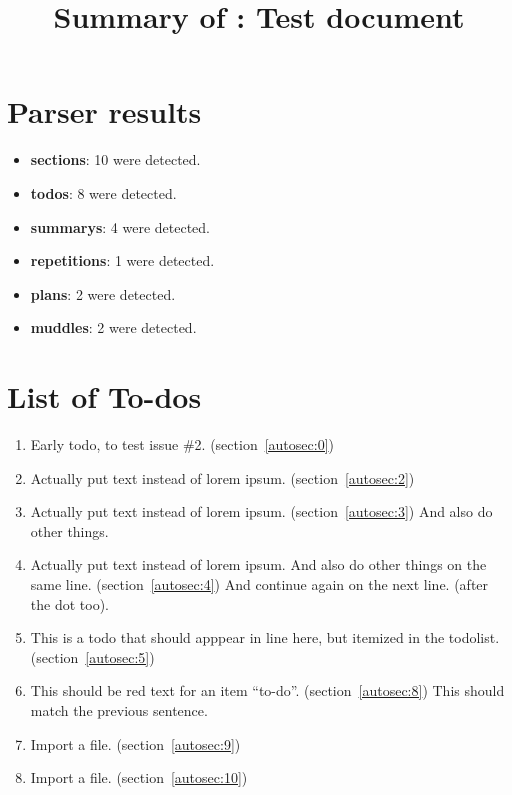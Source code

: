 \title{Summary of : Test document}
\maketitle

\section{Parser results}
    \begin{itemize}[noitemsep]
\item \textbf{sections}: 10 were detected.
\item \textbf{todos}: 8 were detected.
\item \textbf{summarys}: 4 were detected.
\item \textbf{repetitions}: 1 were detected.
\item \textbf{plans}: 2 were detected.
\item \textbf{muddles}: 2 were detected.
    \end{itemize}

\section{List of To-dos}
    \begin{enumerate}[noitemsep]
        \item {\color{red}Early todo, to test issue \#2.} (section~\ref{autosec:0})
        \item {\color{red}Actually put text instead of lorem ipsum.} (section~\ref{autosec:2})
        \item {\color{red}Actually put text instead of lorem ipsum.} (section~\ref{autosec:3})
{\color{red}And also do other things.}
        \item {\color{red}Actually put text instead of lorem ipsum. And also do other things on the same line.} (section~\ref{autosec:4})
{\color{red}And continue again on the next line. (after the dot too).}
        \item {\color{red}This is a todo that should apppear in line here, but itemized in the todolist.} (section~\ref{autosec:5})
        \item {\color{red}This should be red text for an item ``to-do''.} (section~\ref{autosec:8})
{\color{red}This should match the previous sentence.}
        \item {\color{red}Import a file.} (section~\ref{autosec:9})
        \item {\color{red}Import a file.} (section~\ref{autosec:10})
    \end{enumerate}

